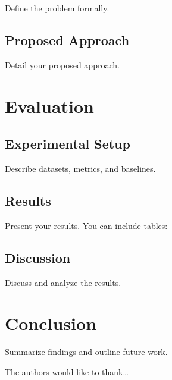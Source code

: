 \documentclass[sigconf,review]{acmart}
\begin{document}
Define the problem formally.

\subsection{Proposed Approach}

Detail your proposed approach.

\section{Evaluation}

\subsection{Experimental Setup}

Describe datasets, metrics, and baselines.

\subsection{Results}

Present your results. You can include tables:


\subsection{Discussion}

Discuss and analyze the results.

\section{Conclusion}

Summarize findings and outline future work.

\begin{acks}
    The authors would like to thank\ldots
\end{acks}



\end{document}
